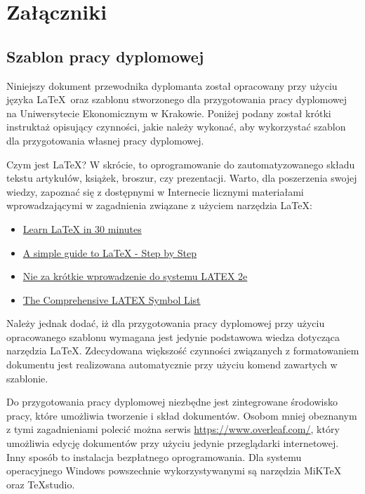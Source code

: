 \chapter*{Załączniki}
\label{chap:zalaczniki}



\section*{Szablon pracy dyplomowej}

Niniejszy dokument przewodnika dyplomanta został opracowany przy użyciu języka \LaTeX~oraz szablonu stworzonego dla przygotowania pracy dyplomowej na Uniwersytecie Ekonomicznym w Krakowie. Poniżej podany został krótki instruktaż opisujący czynności, jakie należy wykonać, aby wykorzystać szablon dla przygotowania własnej pracy dyplomowej.

Czym jest \LaTeX? W skrócie, to oprogramowanie do zautomatyzowanego składu tekstu artykułów, książek, broszur, czy prezentacji. Warto, dla poszerzenia swojej wiedzy, zapoznać się z dostępnymi w Internecie licznymi materiałami wprowadzającymi w zagadnienia związane z użyciem narzędzia \LaTeX:

\begin{itemize}
	\item \href{https://www.overleaf.com/learn/latex/Learn_LaTeX_in_30_minutes}{Learn LaTeX in 30 minutes}
	\item \href{https://www.latex-tutorial.com/tutorials/}{A simple guide to LaTeX - Step by Step}
	\item \href{http://www.ptep-online.com/ctan/lshort_polish.pdf}{Nie za krótkie wprowadzenie do systemu LATEX 2e}
	\item \href{http://piotrkosoft.net/pub/mirrors/CTAN/info/symbols/comprehensive/symbols-a4.pdf}{The Comprehensive LATEX Symbol List}
\end{itemize}

Należy jednak dodać, iż dla przygotowania pracy dyplomowej przy użyciu opracowanego szablonu wymagana jest jedynie podstawowa wiedza dotycząca narzędzia \LaTeX. Zdecydowana większość czynności związanych z formatowaniem dokumentu jest realizowana automatycznie przy użyciu komend zawartych w szablonie.

Do przygotowania pracy dyplomowej niezbędne jest zintegrowane środowisko pracy, które umożliwia tworzenie i skład dokumentów. Osobom mniej obeznanym z tymi zagadnieniami polecić można serwis \url{https://www.overleaf.com/}, który umożliwia edycję dokumentów przy użyciu jedynie przeglądarki internetowej. Inny sposób to instalacja bezpłatnego oprogramowania. Dla systemu operacyjnego Windows powszechnie wykorzystywanymi są narzędzia MiKTeX  oraz TeXstudio.



